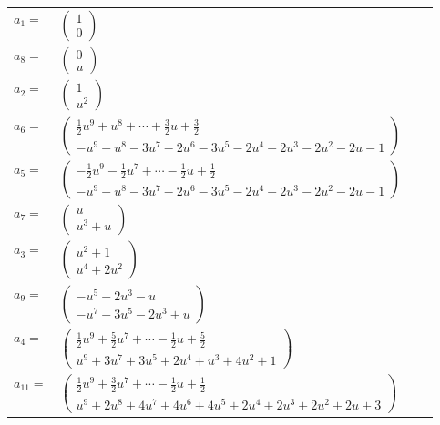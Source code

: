 \documentclass[1p]{elsarticle_modified}
\theoremstyle{definition}
\begin{document}
\begin{tabular}{m{7pt} m{180pt} m{7pt} m{180pt} }
\flushright $a_{1}=$&$\begin{pmatrix}1\\0\end{pmatrix}$ \\
\flushright $a_{8}=$&$\begin{pmatrix}0\\u\end{pmatrix}$ \\
\flushright $a_{2}=$&$\begin{pmatrix}1\\u^2\end{pmatrix}$ \\
\flushright $a_{6}=$&$\begin{pmatrix}\frac{1}{2} u^9+u^8+\cdots+\frac{3}{2} u+\frac{3}{2}\\- u^9- u^8-3 u^7-2 u^6-3 u^5-2 u^4-2 u^3-2 u^2-2 u-1\end{pmatrix}$ \\
\flushright $a_{5}=$&$\begin{pmatrix}-\frac{1}{2} u^9-\frac{1}{2} u^7+\cdots-\frac{1}{2} u+\frac{1}{2}\\- u^9- u^8-3 u^7-2 u^6-3 u^5-2 u^4-2 u^3-2 u^2-2 u-1\end{pmatrix}$ \\
\flushright $a_{7}=$&$\begin{pmatrix}u\\u^3+u\end{pmatrix}$ \\
\flushright $a_{3}=$&$\begin{pmatrix}u^2+1\\u^4+2 u^2\end{pmatrix}$ \\
\flushright $a_{9}=$&$\begin{pmatrix}- u^5-2 u^3- u\\- u^7-3 u^5-2 u^3+u\end{pmatrix}$ \\
\flushright $a_{4}=$&$\begin{pmatrix}\frac{1}{2} u^9+\frac{5}{2} u^7+\cdots-\frac{1}{2} u+\frac{5}{2}\\u^9+3 u^7+3 u^5+2 u^4+u^3+4 u^2+1\end{pmatrix}$ \\
\flushright $a_{11}=$&$\begin{pmatrix}\frac{1}{2} u^9+\frac{3}{2} u^7+\cdots-\frac{1}{2} u+\frac{1}{2}\\u^9+2 u^8+4 u^7+4 u^6+4 u^5+2 u^4+2 u^3+2 u^2+2 u+3\end{pmatrix}$ \\

\end{tabular}
\end{document}
